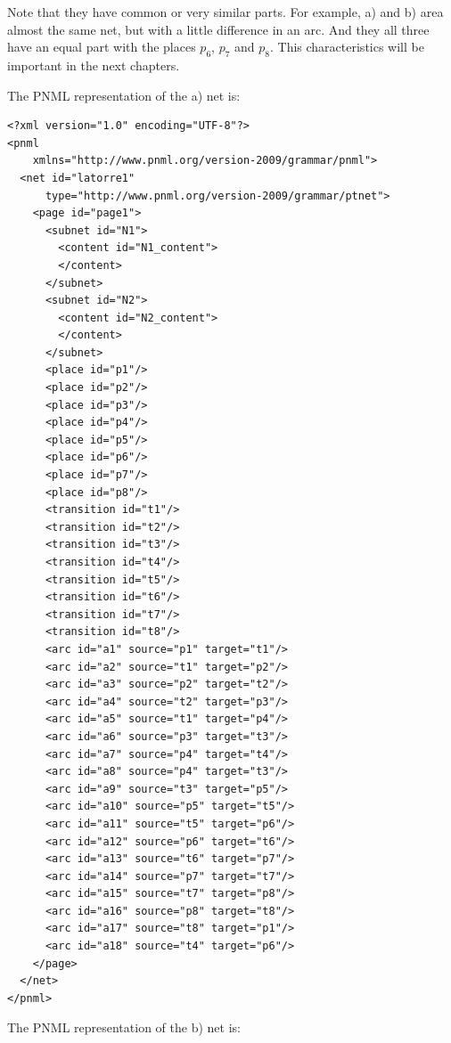 Note that they have common or very similar parts. For example, a) and b)
area almost the same net, but with a little difference in an arc. And they
all three have an equal part with the places $p_6$, $p_7$ and $p_8$. This characteristics
will be important in the next chapters.

The PNML representation of the a) net is:


\begin{lstlisting}
<?xml version="1.0" encoding="UTF-8"?>
<pnml
    xmlns="http://www.pnml.org/version-2009/grammar/pnml">
  <net id="latorre1"
      type="http://www.pnml.org/version-2009/grammar/ptnet">
    <page id="page1">
      <subnet id="N1">
        <content id="N1_content">
        </content>
      </subnet>
      <subnet id="N2">
        <content id="N2_content">
        </content>
      </subnet>
      <place id="p1"/>
      <place id="p2"/>
      <place id="p3"/>
      <place id="p4"/>
      <place id="p5"/>
      <place id="p6"/>
      <place id="p7"/>
      <place id="p8"/>
      <transition id="t1"/>
      <transition id="t2"/>
      <transition id="t3"/>
      <transition id="t4"/>
      <transition id="t5"/>
      <transition id="t6"/>
      <transition id="t7"/>
      <transition id="t8"/>
      <arc id="a1" source="p1" target="t1"/>
      <arc id="a2" source="t1" target="p2"/>
      <arc id="a3" source="p2" target="t2"/>
      <arc id="a4" source="t2" target="p3"/>
      <arc id="a5" source="t1" target="p4"/>
      <arc id="a6" source="p3" target="t3"/>
      <arc id="a7" source="p4" target="t4"/>
      <arc id="a8" source="p4" target="t3"/>
      <arc id="a9" source="t3" target="p5"/>
      <arc id="a10" source="p5" target="t5"/>
      <arc id="a11" source="t5" target="p6"/>
      <arc id="a12" source="p6" target="t6"/>
      <arc id="a13" source="t6" target="p7"/>
      <arc id="a14" source="p7" target="t7"/>
      <arc id="a15" source="t7" target="p8"/>
      <arc id="a16" source="p8" target="t8"/>
      <arc id="a17" source="t8" target="p1"/>
      <arc id="a18" source="t4" target="p6"/>
    </page>
  </net>
</pnml>
\end{lstlisting}


The PNML representation of the b) net is:


